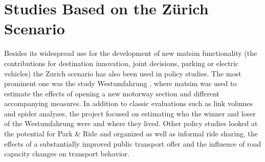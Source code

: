 \section{Studies Based on the Zürich Scenario}
Besides its widespread use for the development of new \gls{matsim} functionality (\eg the contributions for destination innovation, joint decisions, parking or electric vehicles) the Zurich scenario has also been used in policy studies. 
The most prominent one was the study Westumfahrung \citep{BalmerEtAl_ResRep_bdktzrh_2009}, where \gls{matsim} was used to estimate the effects of opening a new motorway section and different accompanying measures. 
In addition to classic evaluations such as link volumes and spider analyses, the project focused on estimating who the winner and loser of the Westumfahrung were and where they lived. 
Other policy studies looked at the potential for Park \& Ride and organized as well as informal ride sharing, the effects of a substantially improved public transport offer and the influence of road capacity changes on transport behavior. 


